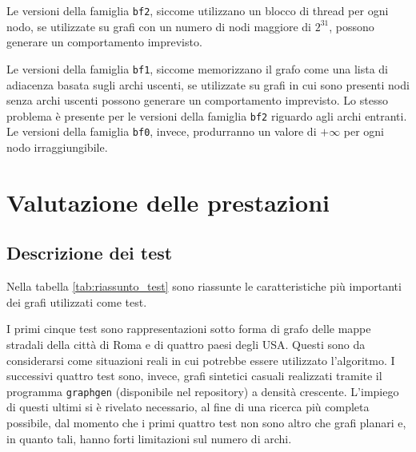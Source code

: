 \documentclass[12pt,a4paper]{book} %
\begin{document}
	Le versioni della famiglia \texttt{bf2}, siccome utilizzano un blocco di thread per ogni nodo, se utilizzate su grafi con un numero di nodi maggiore di $2^{31}$, possono generare un comportamento imprevisto.
	
	Le versioni della famiglia \texttt{bf1}, siccome memorizzano il grafo come una lista di adiacenza basata sugli archi uscenti, se utilizzate su grafi in cui sono presenti nodi senza archi uscenti possono generare un comportamento imprevisto. Lo stesso problema è presente per le versioni della famiglia \texttt{bf2} riguardo agli archi entranti. Le versioni della famiglia \texttt{bf0}, invece, produrranno un valore di $+\infty$ per ogni nodo irraggiungibile.
	
	\chapter{Valutazione delle prestazioni}
	\label{section:perf}
	
	\section{Descrizione dei test}
	Nella tabella \ref{tab:riassunto_test} sono riassunte le caratteristiche più importanti dei grafi utilizzati come test.
	
	I primi cinque test sono rappresentazioni sotto forma di grafo delle mappe stradali della città di Roma e di quattro paesi degli USA. Questi sono da considerarsi come situazioni reali in cui potrebbe essere utilizzato l'algoritmo. I successivi quattro test sono, invece, grafi sintetici casuali realizzati tramite il programma \texttt{graphgen} (disponibile nel repository) a densità crescente. L'impiego di questi ultimi si è rivelato necessario, al fine di una ricerca più completa possibile, dal momento che i primi quattro test non sono altro che grafi planari e, in quanto tali, hanno forti limitazioni sul numero di archi.
	
\end{document}
